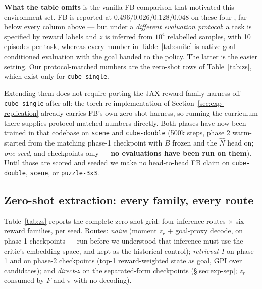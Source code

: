 \documentclass[10pt]{article}
\begin{document}
\textbf{What the table omits} is the vanilla-FB comparison that motivated this environment
set. FB is reported at $0.496 / 0.026 / 0.128 / 0.048$ on these four
\citep{bagatella2025tdjepa}, far below every column above --- but under a \emph{different
evaluation protocol}: a task is specified by reward labels and $z$ is inferred from
$10^4$ relabelled samples, with 10 episodes per task, whereas every number in
Table~\ref{tab:suite} is native goal-conditioned evaluation with the goal handed to the
policy. The latter is the easier setting. Our protocol-matched numbers are the zero-shot
rows of Table~\ref{tab:zs}, which exist only for \texttt{cube-single}.

Extending them does not require porting the JAX reward-family harness off
\texttt{cube-single} after all: the torch re-implementation of
Section~\ref{sec:exp-replication} already carries FB's own zero-shot harness, so running
the curriculum there supplies protocol-matched numbers directly. Both phases have now been
trained in that codebase on \texttt{scene} and \texttt{cube-double} (500k steps, phase 2
warm-started from the matching phase-1 checkpoint with $B$ frozen and the $\hat N$ head on;
\emph{one seed}, and checkpoints only --- \textbf{no evaluations have been run on them}).
Until those are scored and seeded we make no head-to-head FB claim on
\texttt{cube-double}, \texttt{scene}, or \texttt{puzzle-3x3}.

\subsection{Zero-shot extraction: every family, every route}
\label{sec:exp-zs}

Table~\ref{tab:zs} reports the complete zero-shot grid: four inference routes
$\times$ six reward families, per seed.
Routes: \emph{naive} (moment $z_r$ + goal-proxy decode, on phase-1 checkpoints ---
run before we understood that inference must use the critic's embedding space, and
kept as the historical control); \emph{retrieval-1} on phase-1 and on phase-2
checkpoints (top-1 reward-weighted state as goal, GPI over candidates); and
\emph{direct-$z$} on the separated-form checkpoints (\S\ref{sec:exp-sep}; $z_r$
consumed by $F$ and $\pi$ with no decoding).
\end{document}
